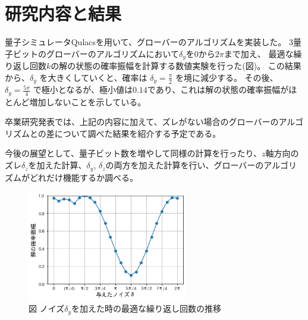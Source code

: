 \documentclass[platex,dvipdfmx, twocolumn]{jsarticle}			%
\begin{document}
\section{研究内容と結果}
量子シミュレータQulacsを用いて、グローバーのアルゴリズムを実装した。
3量子ビットのグローバーのアルゴリズムにおいて$\delta_y$を$0$から$2\pi$まで加え、
最適な繰り返し回数$k$の解の状態の確率振幅を計算する数値実験を行った(図)。
この結果から、$\delta_y$ を大きくしていくと、確率は $\delta_y = \frac{\pi}{2}$ を境に減少する。
その後、 $\delta_y = \frac{5\pi}{4}$ で極小となるが、極小値は$0.14$であり、これは解の状態の確率振幅がほとんど増加しないことを示している。

卒業研究発表では、上記の内容に加えて、ズレがない場合のグローバーのアルゴリズムとの差について調べた結果を紹介する予定である。

今後の展望として、量子ビット数を増やして同様の計算を行ったり、$z$軸方向のズレ$\delta_z$を加えた計算、$\delta_y$, $\delta_z$の両方を加えた計算を行い、グローバーのアルゴリズムがどれだけ機能するか調べる。

\begin{figure}
\centering
\includegraphics[width=70mm]{figures/sample.png}
\caption*{図 ノイズ$\delta_y$を加えた時の最適な繰り返し回数の推移}
\label{fig:P(k)}
\end{figure}



\end{document}
